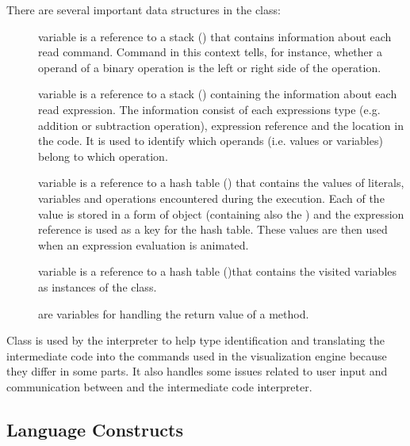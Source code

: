 There are several important data structures in the  class:
\begin{description}
\item[] variable is a reference to a stack () that contains information about each read command. Command in this context tells, for instance, whether a operand of a binary operation is the left or right side of the operation.
\item[] variable is a reference to a stack () containing the information about each read expression. The information consist of each expressions type (e.g. addition or subtraction operation), expression reference and the location in the code. It is used to
identify which operands (i.e. values or variables) belong to which operation.
\item[] variable is a reference to a hash table () that contains the values of literals, variables and operations encountered during the execution. Each of the value is stored in a form of  object (containing also the ) and the expression reference is used as a key for the hash table. These values are then used when an expression evaluation is animated.
\item[] variable is a reference to a hash table ()that contains the visited variables as instances of the  class. 
\item[]
\item[]
\item[]
\item[]
\item[]
\item[] 
\item[]
\item[] are variables for handling the return value of a method.
\end{description}

Class  is used by the interpreter to help type identification and
translating the intermediate code into the commands used in the visualization engine because they differ in some parts. It also handles some issues related to user input
and communication between \djava{} and the intermediate code interpreter. 

\subsection{Language Constructs}
\label{sec:Language_package}

